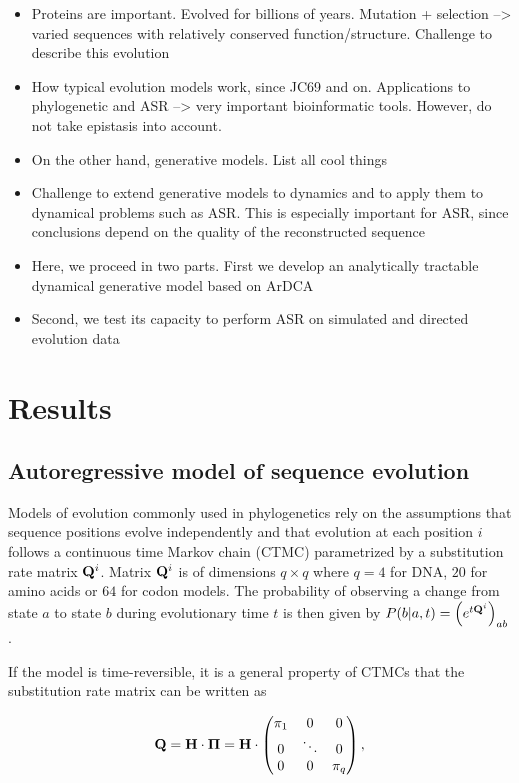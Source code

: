 \begin{itemize}
	\item Proteins are important. Evolved for billions of years. Mutation + selection --> varied sequences with relatively conserved function/structure. Challenge to describe this evolution
	\item How typical evolution models work, since JC69 and on. Applications to phylogenetic and ASR --> very important bioinformatic tools. However, do not take epistasis into account. 
	\item On the other hand, generative models. List all cool things
	\item Challenge to extend generative models to dynamics and to apply them to dynamical problems such as ASR. This is especially important for ASR, since conclusions depend on the quality of the reconstructed sequence 
	\item Here, we proceed in two parts. First we develop an analytically tractable dynamical generative model based on ArDCA
	\item Second, we test its capacity to perform ASR on simulated and directed evolution data
\end{itemize}

\section{Results} %
\label{sub:results}

\subsection{Autoregressive model of sequence evolution} 
\label{sub:autoregressive_sequence_evolution_model}

Models of evolution commonly used in phylogenetics rely on the assumptions that sequence positions evolve independently and that evolution at each position $i$ follows a continuous time Markov chain (CTMC) parametrized by a substitution rate matrix $\mathbf{Q}^i$. 
Matrix $\mathbf{Q}^i$ is of dimensions $q \times q$ where $q=4$ for DNA, $20$ for amino acids or $64$ for codon models.
The probability of observing a change from state $a$ to state $b$ during evolutionary time $t$ is then given by $P(b \vert a, t) = \left( e^{t\mathbf{Q}^i} \right)_{ab}$.

If the model is time-reversible, it is a general property of CTMCs that the substitution rate matrix can be written as 

\begin{equation}
	\label{eq:Q_decomposition}
	\mathbf{Q} = \mathbf{H}\cdot \mathbf{\Pi} = \mathbf{H} \cdot \begin{pmatrix}
		\pi_1 & 0 & 0\\ 
		0 & \ddots & 0 \\
		0 & 0 & \pi_q
	\end{pmatrix},
\end{equation}

